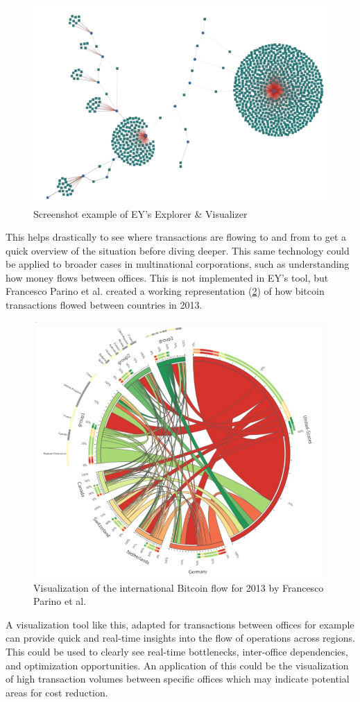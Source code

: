 \begin{figure}[h!]
    \centering
    \includegraphics[width=0.5\linewidth]{include/EY visualizer 2.png}    
    \caption{Screenshot example of EY's Explorer \& Visualizer \cite{ey_explorer_visualizer}}
    \label{fig:ey visualizer}
\end{figure}

This helps drastically to see where transactions are flowing to and from to get a quick overview of the situation before diving deeper. This same technology could be applied to broader cases in multinational corporations, such as understanding how money flows between offices. This is not implemented in EY's tool, but Francesco Parino et al. \cite{btcCountryFlows} created a working representation (\cref{fig:btc flow}) of how bitcoin transactions flowed between countries in 2013.

\begin{figure}[h!]
    \centering
    \includegraphics[width=0.6\linewidth]{include/BTC flow.png}
    \caption{Visualization of the international Bitcoin flow for 2013 by Francesco Parino et al. \cite{btcCountryFlows}}
    \label{fig:btc flow}
\end{figure}

A visualization tool like this, adapted for transactions between offices for example can provide quick and real-time insights into the flow of operations across regions. This could be used to clearly see real-time bottlenecks, inter-office dependencies, and optimization opportunities. An application of this could be the visualization of high transaction volumes between specific offices which may indicate potential areas for cost reduction. 

